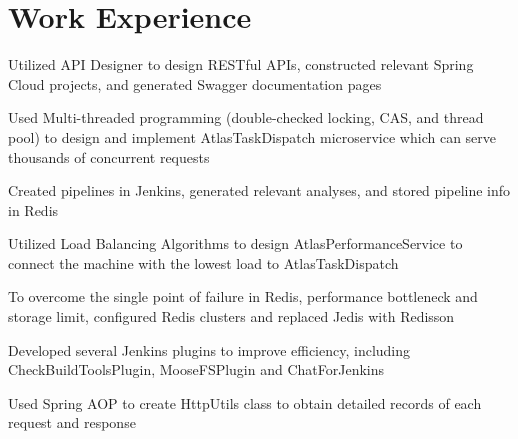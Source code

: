 \documentclass[]{deedy-resume-openfont}
\begin{document}
\section{Work Experience}
\hfill {}
\begin{tightemize}
	\item Utilized API Designer to design RESTful API\textquotesingle{}s, constructed relevant Spring Cloud projects, and generated Swagger documentation pages
	\item Used Multi-threaded programming (double-checked locking, CAS, and thread pool) to design and implement AtlasTaskDispatch microservice which can serve thousands of concurrent requests
	\item Created pipelines in Jenkins, generated relevant analyses, and stored pipeline info in Redis
	\item Utilized Load Balancing Algorithms to design AtlasPerformanceService to connect the machine with the lowest load to AtlasTaskDispatch
	\item To overcome the single point of failure in Redis, performance bottleneck and storage limit, configured Redis clusters and replaced Jedis with Redisson
	\item Developed several Jenkins plugins to improve efficiency, including CheckBuildToolsPlugin, MooseFSPlugin and ChatForJenkins
	\item Used Spring AOP to create HttpUtils class to obtain detailed records of each request and response
\end{tightemize}
\sectionsep
{}\hfill {}
\end{document}
